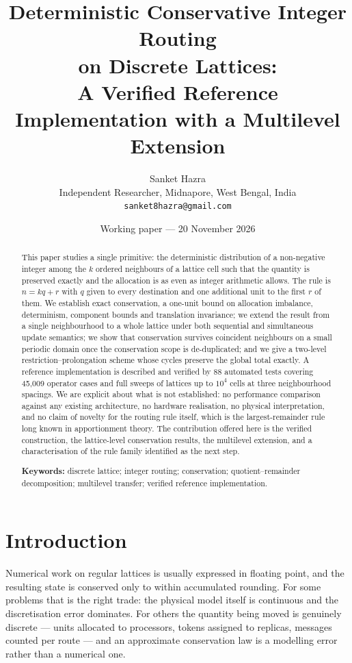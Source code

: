 \documentclass[11pt,a4paper]{article}
\title{\bfseries Deterministic Conservative Integer Routing\\
on Discrete Lattices:\\[0.3em]
\large A Verified Reference Implementation with a Multilevel Extension}
\author{Sanket Hazra\\
\small Independent Researcher, Midnapore, West Bengal, India\\
\small \texttt{sanket8hazra@gmail.com}}
\date{Working paper --- 20 November 2026}
\theoremstyle{definition}
\begin{document}
\maketitle

\begin{abstract}
\noindent
This paper studies a single primitive: the deterministic distribution of a
non-negative integer among the $k$ ordered neighbours of a lattice cell such
that the quantity is preserved exactly and the allocation is as even as
integer arithmetic allows. The rule is $n = kq + r$ with $q$ given to every
destination and one additional unit to the first $r$ of them. We establish
exact conservation, a one-unit bound on allocation imbalance, determinism,
component bounds and translation invariance; we extend the result from a
single neighbourhood to a whole lattice under both sequential and simultaneous
update semantics; we show that conservation survives coincident neighbours on
a small periodic domain once the conservation scope is de-duplicated; and we
give a two-level restriction--prolongation scheme whose cycles preserve the
global total exactly. A reference implementation is described and verified by
88 automated tests covering 45{,}009 operator cases and full sweeps of
lattices up to $10^4$ cells at three neighbourhood spacings. We are explicit
about what is not established: no performance comparison against any existing
architecture, no hardware realisation, no physical interpretation, and no
claim of novelty for the routing rule itself, which is the largest-remainder
rule long known in apportionment theory. The contribution offered here is the
verified construction, the lattice-level conservation results, the multilevel
extension, and a characterisation of the rule family identified as the next
step.

\medskip
\noindent
\textbf{Keywords:} discrete lattice; integer routing; conservation;
quotient--remainder decomposition; multilevel transfer; verified reference
implementation.
\end{abstract}

\section{Introduction}

Numerical work on regular lattices is usually expressed in floating point, and
the resulting state is conserved only to within accumulated rounding. For some
problems that is the right trade: the physical model itself is continuous and
the discretisation error dominates. For others the quantity being moved is
genuinely discrete --- units allocated to processors, tokens assigned to
replicas, messages counted per route --- and an approximate conservation law is
a modelling error rather than a numerical one.
\end{document}
